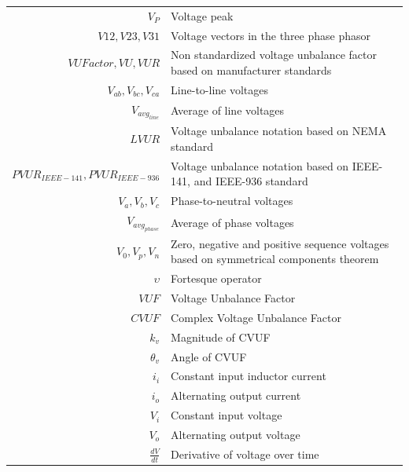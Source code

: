 \begin{scriptsize}
\begin{tabularx}{\textwidth}{r|X}

	$V_P$															& Voltage peak\\
	$V12, V23, V31$										& Voltage vectors in the three phase phasor\\
  $VUFactor,VU,VUR$                	& Non standardized voltage unbalance factor based on manufacturer standards\\
	$V_{ab},V_{bc},V_{ca}$  					& Line-to-line voltages\\
	$V_{avg_{line}}$  								& Average of line voltages\\
	$LVUR$														& Voltage unbalance notation based on NEMA standard\\
	$PVUR_{IEEE-141},PVUR_{IEEE-936}$	& Voltage unbalance notation based on IEEE-141, and IEEE-936 standard\\
	$V_{a},V_{b},V_{c}$  							& Phase-to-neutral voltages\\
	$V_{avg_{phase}}$  								& Average of phase voltages\\
	$V_{0},V_{p},V_{n}$  							& Zero, negative and positive sequence voltages based on symmetrical components theorem\\
  $\upsilon$  											& Fortesque operator\\
	$VUF$  														& Voltage Unbalance Factor\\
	$CVUF$  													& Complex Voltage Unbalance Factor\\
	$k_v$  														& Magnitude of CVUF\\
	$\theta_v$  											& Angle of CVUF\\
	$i_i$															& Constant input inductor current\\
	$i_o$															& Alternating output current\\
	$V_i$															& Constant input voltage\\
	$V_o$															& Alternating output voltage\\
	$\frac{dV}{dt}$										& Derivative of voltage over time\\

\end{tabularx}
\end{scriptsize}
